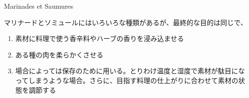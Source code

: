 \begin{main}
\begin{frsecenv}

Marinades et Saumures

\end{frsecenv}

 

\vspace{1\zw}

マリナードとソミュールにはいろいろな種類があるが、最終的な目的は同じで、

\begin{enumerate}
\def\labelenumi{\arabic{enumi}.}
\item
  素材に料理で使う香辛料やハーブの香りを浸み込ませる
\item
  ある種の肉を柔らかくさせる
\item
  場合によっては保存のために用いる。とりわけ温度と湿度で素材が駄目になってしまうような場合。さらに、目指す料理の仕上がりに合わせて素材の状態を調節する
\end{enumerate}

\end{main}

